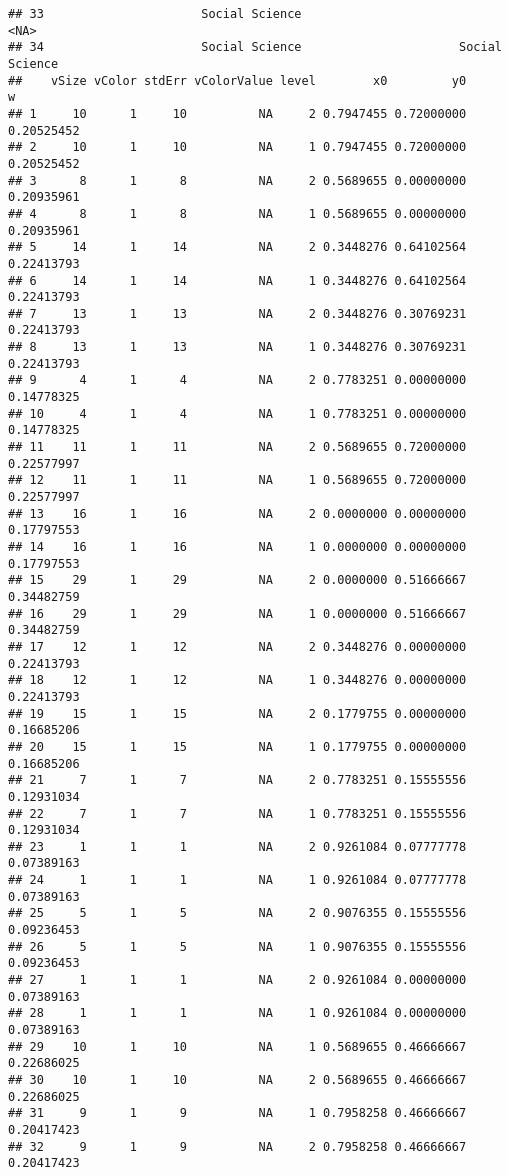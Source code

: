 \documentclass[
]{article}
\begin{document}
\begin{verbatim}
## 33                      Social Science                                <NA>
## 34                      Social Science                      Social Science
##    vSize vColor stdErr vColorValue level        x0         y0          w
## 1     10      1     10          NA     2 0.7947455 0.72000000 0.20525452
## 2     10      1     10          NA     1 0.7947455 0.72000000 0.20525452
## 3      8      1      8          NA     2 0.5689655 0.00000000 0.20935961
## 4      8      1      8          NA     1 0.5689655 0.00000000 0.20935961
## 5     14      1     14          NA     2 0.3448276 0.64102564 0.22413793
## 6     14      1     14          NA     1 0.3448276 0.64102564 0.22413793
## 7     13      1     13          NA     2 0.3448276 0.30769231 0.22413793
## 8     13      1     13          NA     1 0.3448276 0.30769231 0.22413793
## 9      4      1      4          NA     2 0.7783251 0.00000000 0.14778325
## 10     4      1      4          NA     1 0.7783251 0.00000000 0.14778325
## 11    11      1     11          NA     2 0.5689655 0.72000000 0.22577997
## 12    11      1     11          NA     1 0.5689655 0.72000000 0.22577997
## 13    16      1     16          NA     2 0.0000000 0.00000000 0.17797553
## 14    16      1     16          NA     1 0.0000000 0.00000000 0.17797553
## 15    29      1     29          NA     2 0.0000000 0.51666667 0.34482759
## 16    29      1     29          NA     1 0.0000000 0.51666667 0.34482759
## 17    12      1     12          NA     2 0.3448276 0.00000000 0.22413793
## 18    12      1     12          NA     1 0.3448276 0.00000000 0.22413793
## 19    15      1     15          NA     2 0.1779755 0.00000000 0.16685206
## 20    15      1     15          NA     1 0.1779755 0.00000000 0.16685206
## 21     7      1      7          NA     2 0.7783251 0.15555556 0.12931034
## 22     7      1      7          NA     1 0.7783251 0.15555556 0.12931034
## 23     1      1      1          NA     2 0.9261084 0.07777778 0.07389163
## 24     1      1      1          NA     1 0.9261084 0.07777778 0.07389163
## 25     5      1      5          NA     2 0.9076355 0.15555556 0.09236453
## 26     5      1      5          NA     1 0.9076355 0.15555556 0.09236453
## 27     1      1      1          NA     2 0.9261084 0.00000000 0.07389163
## 28     1      1      1          NA     1 0.9261084 0.00000000 0.07389163
## 29    10      1     10          NA     1 0.5689655 0.46666667 0.22686025
## 30    10      1     10          NA     2 0.5689655 0.46666667 0.22686025
## 31     9      1      9          NA     1 0.7958258 0.46666667 0.20417423
## 32     9      1      9          NA     2 0.7958258 0.46666667 0.20417423

\end{verbatim}
\end{document}
